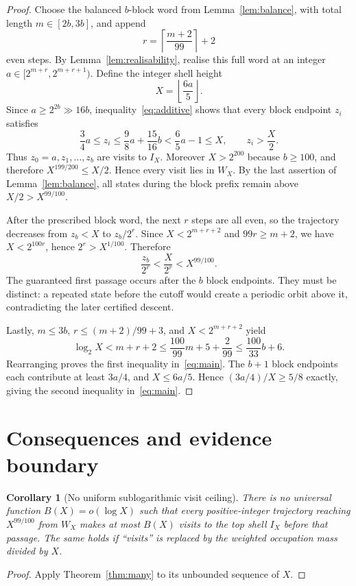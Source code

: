 \documentclass[11pt,a4paper]{article}
\newtheorem{corollary}[theorem]{Corollary}
\begin{document}
\begin{proof}
Choose the balanced $b$-block word from Lemma~\ref{lem:balance},
with total length $m\in[2b,3b]$, and append
\[
 r=\left\lceil\frac{m+2}{99}\right\rceil+2
\]
even steps. By Lemma~\ref{lem:realisability}, realise this full
word at an integer $a\in[2^{m+r},2^{m+r+1})$. Define the integer
shell height
\[
 X=\left\lfloor\frac{6a}{5}\right\rfloor.
\]
Since $a\ge2^{2b}\gg16b$, inequality~\eqref{eq:additive}
shows that every block endpoint $z_i$ satisfies
\[
 \frac34a\le z_i\le\frac98a+\frac{15}{16}b
 <\frac65a-1\le X,\qquad
 z_i>\frac X2.
\]
Thus $z_0=a,z_1,\ldots,z_b$ are visits to $I_X$. Moreover
$X>2^{200}$ because $b\ge100$, and therefore
$X^{199/200}\le X/2$. Hence every visit lies in $W_X$.
By the last assertion of Lemma~\ref{lem:balance}, all states
during the block prefix remain above $X/2>X^{99/100}$.

After the prescribed block word, the next $r$ steps are all even,
so the trajectory decreases from $z_b<X$ to $z_b/2^r$.
Since $X<2^{m+r+2}$ and $99r\ge m+2$, we have
$X<2^{100r}$, hence $2^r>X^{1/100}$. Therefore
\[
 \frac{z_b}{2^r}<\frac{X}{2^r}<X^{99/100}.
\]
The guaranteed first passage occurs after the $b$ block
endpoints. They must be distinct: a repeated state before the
cutoff would create a periodic orbit above it, contradicting the
later certified descent.

Lastly, $m\le3b$, $r\le(m+2)/99+3$, and $X<2^{m+r+2}$ yield
\[
 \log_2 X<m+r+2
 \le\frac{100}{99}m+5+\frac2{99}
 \le\frac{100}{33}b+6.
\]
Rearranging proves the first inequality in~\eqref{eq:main}.
The $b+1$ block endpoints each contribute at least $3a/4$,
and $X\le6a/5$. Hence $(3a/4)/X\ge5/8$ exactly, giving
the second inequality in~\eqref{eq:main}.
\end{proof}

\section{Consequences and evidence boundary}
\begin{corollary}[No uniform sublogarithmic visit ceiling]
There is no universal function $B(X)=o(\log X)$ such that every
positive-integer trajectory reaching $X^{99/100}$ from $W_X$ makes
at most $B(X)$ visits to the top shell $I_X$ before that passage.
The same holds if ``visits'' is replaced by the weighted occupation
mass divided by $X$.
\end{corollary}
\begin{proof}
Apply Theorem~\ref{thm:many} to its unbounded sequence of $X$.
\end{proof}
\end{document}
